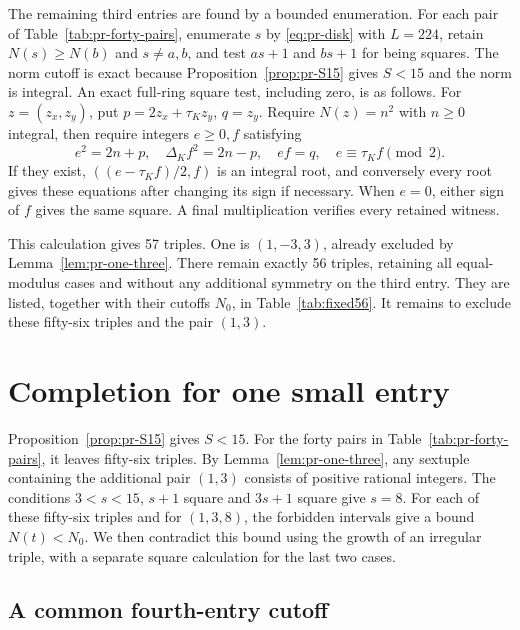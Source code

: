 \documentclass[12pt]{article}
\numberwithin{equation}{section}
\begin{document}
The remaining third entries are found by a bounded enumeration.
For each pair of
Table~\ref{tab:pr-forty-pairs}, enumerate \(s\) by
\eqref{eq:pr-disk} with \(L=224\), retain \(N(s)\ge N(b)\) and
\(s\ne a,b\), and test \(as+1\) and \(bs+1\) for being squares.
The norm cutoff is exact because Proposition~\ref{prop:pr-S15}
gives \(S<15\) and the norm is integral.
An exact full-ring square test, including zero, is as follows.
For \(z=(z_x,z_y)\), put \(p=2z_x+\tau_Kz_y\), \(q=z_y\).
Require \(N(z)=n^2\) with \(n\ge0\) integral, then require integers
\(e\ge0,f\) satisfying
\[
 e^2=2n+p,\quad \Delta_Kf^2=2n-p,\quad ef=q,
 \quad e\equiv\tau_Kf\pmod2.
\]
If they exist, \(((e-\tau_Kf)/2,f)\) is an integral root, and conversely
every root gives these equations after changing its sign if necessary.
When \(e=0\), either sign of \(f\) gives the same square. A final
multiplication verifies every retained witness.

This calculation gives 57 triples. One is
\((1,-3,3)\), already excluded by Lemma~\ref{lem:pr-one-three}.
There remain exactly 56 triples, retaining all equal-modulus cases and
without any additional symmetry on the third entry. They are listed, together with their cutoffs $N_0$, in
Table~\ref{tab:fixed56}.
It remains to exclude these fifty-six triples and the pair $(1,3)$.

\section{Completion for one small entry}
\label{sec:one-small-completion}

Proposition~\ref{prop:pr-S15} gives $S<15$. For the forty pairs in
Table~\ref{tab:pr-forty-pairs}, it leaves fifty-six triples.
By Lemma~\ref{lem:pr-one-three}, any sextuple containing the
additional pair $(1,3)$ consists of positive rational integers.
The conditions $3<s<15$, $s+1$ square and $3s+1$ square give $s=8$.
For each of these fifty-six triples and for $(1,3,8)$, the forbidden intervals
give a bound $N(t)<N_0$. We then contradict this bound using the growth of an
irregular triple, with a separate square calculation for the last two cases.

\subsection{A common fourth-entry cutoff}
\end{document}

